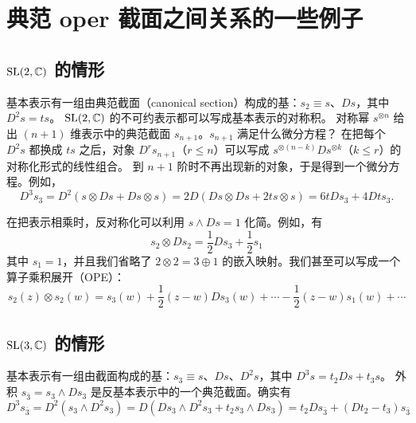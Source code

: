 
\section{典范 oper 截面之间关系的一些例子}\label{somex}
\subsection{${\mathrm{SL}}(2,{\mathbb C})$ 的情形}

基本表示有一组由典范截面（canonical section）构成的基：$s_2 \equiv s$、$Ds$，其中 $D^2 s = t s$。
${\mathrm{SL}}(2,{\mathbb C})$ 的不可约表示都可以写成基本表示的对称积。
对称幂 $s^{\otimes n}$ 给出 $(n+1)$ 维表示中的典范截面 $s_{n+1}$。$s_{n+1}$ 满足什么微分方程？
在把每个 $D^2 s$ 都换成 $t s$ 之后，对象 $D^r s_{n+1}$（$r\leq n$）可以写成 $s^{\otimes (n-k)} Ds ^{\otimes k}$（$k\leq r$）的对称化形式的线性组合。
到 $n+1$ 阶时不再出现新的对象，于是得到一个微分方程。例如，
\begin{equation}
D^3 s_3= D^2(s \otimes Ds + Ds \otimes s) =2 D(Ds \otimes Ds + 2 t s \otimes s) = 6 t Ds_3 + 4 Dt s_3.
\end{equation}


在把表示相乘时，反对称化可以利用 $s \wedge Ds=1$ 化简。例如，有
\begin{equation}
s_2 \otimes Ds_2 = \frac12 D s_3 + \frac12 s_1
\end{equation}
其中 $s_1=1$，并且我们省略了 $2 \otimes 2 = 3\oplus 1$ 的嵌入映射。我们甚至可以写成一个算子乘积展开（OPE）：
\begin{equation}
s_2(z) \otimes s_2(w) = s_3(w) + \frac12(z-w)Ds_3(w) + \cdots - \frac12 (z-w) s_1(w)+ \cdots
\end{equation}
 
\subsection{${\mathrm{SL}}(3,{\mathbb C})$ 的情形}
基本表示有一组由截面构成的基：$s_3 \equiv s$、$Ds$、$D^2s$，其中 $D^3 s = t_2 Ds +t_3 s$。
外积 $s_{\bar 3} = s_3 \wedge Ds_3$ 是反基本表示中的一个典范截面。确实有
\begin{equation}
D^3s_{\bar 3} = D^2(s_3 \wedge D^2s_3) = D(D s_3 \wedge D^2s_3+t_2 s_3 \wedge D s_3) = t_2 Ds_{\bar 3} + (D t_2-t_3) s_{\bar 3}
\end{equation}

